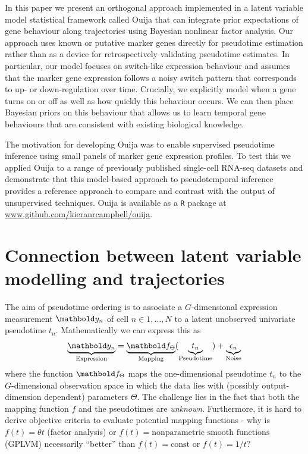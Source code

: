 In this paper we present an orthogonal approach implemented in a latent variable model statistical framework called Ouija that can integrate prior expectations of gene behaviour along trajectories using Bayesian nonlinear factor analysis. Our approach uses known or putative marker genes directly for pseudotime estimation rather than as a device for retrospectively validating pseudotime estimates. In particular, our model focuses on switch-like expression behaviour and assumes that the marker gene expression follows a noisy switch pattern that corresponds to up- or down-regulation over time. Crucially, we explicitly model when a gene turns on or off as well as how quickly this behaviour occurs. We can then place Bayesian priors on this behaviour that allows us to learn temporal gene behaviours that are consistent with existing biological knowledge.

{\color{red}
The motivation for developing Ouija was to enable supervised pseudotime inference using small panels of marker gene expression profiles. To test this we applied Ouija to a range of previously published single-cell RNA-seq datasets and demonstrate that this model-based approach to pseudotemporal inference provides a reference approach to compare and contrast with the output of unsupervised techniques. Ouija is available as a \texttt{R} package at \url{www.github.com/kieranrcampbell/ouija}.
}







\section{Connection between latent variable modelling and trajectories}

The aim of pseudotime ordering is to associate a $G$-dimensional expression measurement $\mby_n$ of cell $n \in 1, \ldots, N$ to a latent unobserved univariate pseudotime $t_n$. Mathematically we can express this as
\begin{align}
 \underbrace{\mby_n}_{\mathclap{\text{Expression}}} = \underbrace{\mbf_\Theta}_{\text{Mapping}}(\underbrace{t_n}_{\text{Pseudotime}}) + \underbrace{\epsilon_n}_{\text{Noise}}
 \label{eq:master_eq}
\end{align}
where the function $\mbf_\Theta$ maps the one-dimensional pseudotime $t_n$ to the $G$-dimensional observation space in which the data lies with (possibly output-dimension dependent) parameters $\Theta$. The challenge lies in the fact that both the mapping function $f$ and the pseudotimes are \emph{unknown}. Furthermore, it is hard to derive objective criteria to evaluate potential mapping functions - why is $f(t) = \theta t$ (factor analysis) or $f(t) = \text{nonparametric smooth functions}$ (GPLVM) necessarily ``better'' than $f(t) = \text{const}$ or $f(t) = 1 / t$?

